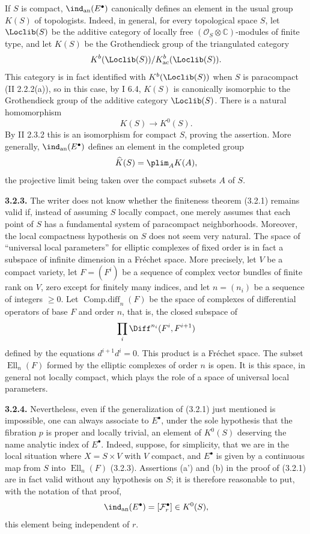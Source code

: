 \documentclass[11pt]{article}
\begin{document}
If $S$ is compact, $\ind_{\mathrm{an}}(E^\bullet)$ canonically defines an element in the usual group $K(S)$ of topologists. Indeed, in general, for every topological space $S$, let $\Loclib(S)$ be the additive category of locally free $(\mathcal O_S\otimes\mathbb C)$-modules of finite type, and let $K(S)$ be the Grothendieck group of the triangulated category
\[
 K^b(\Loclib(S))/K^b_{\mathrm{ac}}(\Loclib(S)).
\]
This category is in fact identified with $K^b(\Loclib(S))$ when $S$ is paracompact (II 2.2.2(a)), so in this case, by I 6.4, $K(S)$ is canonically isomorphic to the Grothendieck group of the additive category $\Loclib(S)$. There is a natural homomorphism
\[
 K(S)\longrightarrow K^0(S).
\]
By II 2.3.2 this is an isomorphism for compact $S$, proving the assertion. More generally, $\ind_{\mathrm{an}}(E^\bullet)$ defines an element in the completed group
\[
 \widehat K(S)=\plim_A K(A),
\]
the projective limit being taken over the compact subsets $A$ of $S$.

\textbf{3.2.3.} The writer does not know whether the finiteness theorem (3.2.1) remains valid if, instead of assuming $S$ locally compact, one merely assumes that each point of $S$ has a fundamental system of paracompact neighborhoods. Moreover, the local compactness hypothesis on $S$ does not seem very natural. The space of ``universal local parameters'' for elliptic complexes of fixed order is in fact a subspace of infinite dimension in a Fréchet space. More precisely, let $V$ be a compact variety, let $F=(F^i)$ be a sequence of complex vector bundles of finite rank on $V$, zero except for finitely many indices, and let $n=(n_i)$ be a sequence of integers $\ge0$. Let $\operatorname{Comp.diff}_n(F)$ be the space of complexes of differential operators of base $F$ and order $n$, that is, the closed subspace of
\[
 \prod_i \Diff^{n_i}(F^i,F^{i+1})
\]
defined by the equations $d^{i+1}d^i=0$. This product is a Fréchet space. The subset $\operatorname{Ell}_n(F)$ formed by the elliptic complexes of order $n$ is open. It is this space, in general not locally compact, which plays the role of a space of universal local parameters.

\textbf{3.2.4.} Nevertheless, even if the generalization of (3.2.1) just mentioned is impossible, one can always associate to $E^\bullet$, under the sole hypothesis that the fibration $p$ is proper and locally trivial, an element of $K^0(S)$ deserving the name analytic index of $E^\bullet$. Indeed, suppose, for simplicity, that we are in the local situation where $X=S\times V$ with $V$ compact, and $E^\bullet$ is given by a continuous map from $S$ into $\operatorname{Ell}_n(F)$ (3.2.3). Assertions (a') and (b) in the proof of (3.2.1) are in fact valid without any hypothesis on $S$; it is therefore reasonable to put, with the notation of that proof,
\[
 \ind_{\mathrm{an}}(E^\bullet)=[\mathcal F_r^\bullet]\in K^0(S),
\]
this element being independent of $r$.
\end{document}

